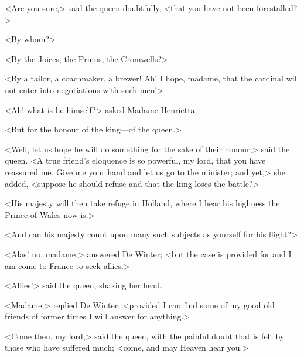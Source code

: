 <Are you sure,> said the queen doubtfully, <that you have not been forestalled?>

<By whom?>

<By the Joices, the Prinns, the Cromwells?>

<By a tailor, a coachmaker, a brewer! Ah! I hope, madame, that the cardinal will not enter into negotiations with such men!>

<Ah! what is he himself?> asked Madame Henrietta.

<But for the honour of the king—of the queen.>

<Well, let us hope he will do something for the sake of their honour,> said the queen. <A true friend's eloquence is so powerful, my lord, that you have reassured me. Give me your hand and let us go to the minister; and yet,> she added, <suppose he should refuse and that the king loses the battle?>

<His majesty will then take refuge in Holland, where I hear his highness the Prince of Wales now is.>

<And can his majesty count upon many such subjects as yourself for his flight?>

<Alas! no, madame,> answered De Winter; <but the case is provided for and I am come to France to seek allies.>

<Allies!> said the queen, shaking her head.

<Madame,> replied De Winter, <provided I can find some of my good old friends of former times I will answer for anything.>

<Come then, my lord,> said the queen, with the painful doubt that is felt by those who have suffered much; <come, and may Heaven hear you.> 